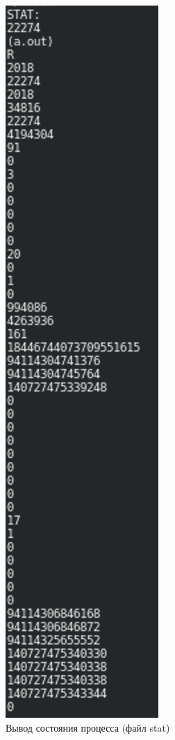 \begin{figure}[H]
    \centering
    \includegraphics{img/part_01/stat.png}
    \caption{Вывод состояния процесса (файл {\ttfamily stat})}
\end{figure}
